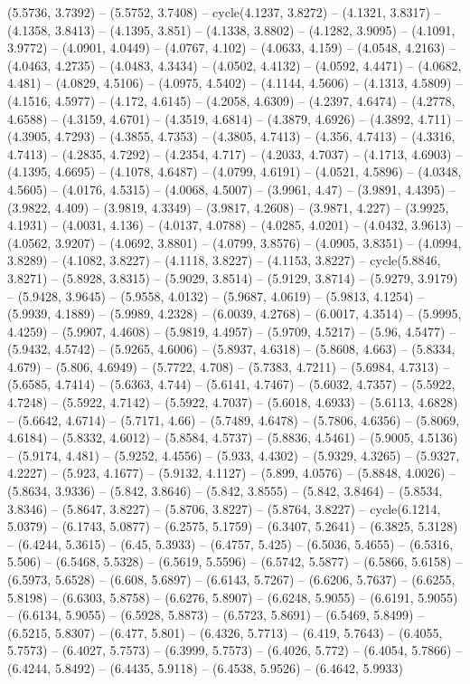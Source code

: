 (5.5736, 3.7392) -- (5.5752, 3.7408) -- cycle(4.1237, 3.8272) -- (4.1321, 3.8317) -- (4.1358, 3.8413) -- (4.1395, 3.851) -- (4.1338, 3.8802) -- (4.1282, 3.9095) -- (4.1091, 3.9772) -- (4.0901, 4.0449) -- (4.0767, 4.102) -- (4.0633, 4.159) -- (4.0548, 4.2163) -- (4.0463, 4.2735) -- (4.0483, 4.3434) -- (4.0502, 4.4132) -- (4.0592, 4.4471) -- (4.0682, 4.481) -- (4.0829, 4.5106) -- (4.0975, 4.5402) -- (4.1144, 4.5606) -- (4.1313, 4.5809) -- (4.1516, 4.5977) -- (4.172, 4.6145) -- (4.2058, 4.6309) -- (4.2397, 4.6474) -- (4.2778, 4.6588) -- (4.3159, 4.6701) -- (4.3519, 4.6814) -- (4.3879, 4.6926) -- (4.3892, 4.711) -- (4.3905, 4.7293) -- (4.3855, 4.7353) -- (4.3805, 4.7413) -- (4.356, 4.7413) -- (4.3316, 4.7413) -- (4.2835, 4.7292) -- (4.2354, 4.717) -- (4.2033, 4.7037) -- (4.1713, 4.6903) -- (4.1395, 4.6695) -- (4.1078, 4.6487) -- (4.0799, 4.6191) -- (4.0521, 4.5896) -- (4.0348, 4.5605) -- (4.0176, 4.5315) -- (4.0068, 4.5007) -- (3.9961, 4.47) -- (3.9891, 4.4395) -- (3.9822, 4.409) -- (3.9819, 4.3349) -- (3.9817, 4.2608) -- (3.9871, 4.227) -- (3.9925, 4.1931) -- (4.0031, 4.136) -- (4.0137, 4.0788) -- (4.0285, 4.0201) -- (4.0432, 3.9613) -- (4.0562, 3.9207) -- (4.0692, 3.8801) -- (4.0799, 3.8576) -- (4.0905, 3.8351) -- (4.0994, 3.8289) -- (4.1082, 3.8227) -- (4.1118, 3.8227) -- (4.1153, 3.8227) -- cycle(5.8846, 3.8271) -- (5.8928, 3.8315) -- (5.9029, 3.8514) -- (5.9129, 3.8714) -- (5.9279, 3.9179) -- (5.9428, 3.9645) -- (5.9558, 4.0132) -- (5.9687, 4.0619) -- (5.9813, 4.1254) -- (5.9939, 4.1889) -- (5.9989, 4.2328) -- (6.0039, 4.2768) -- (6.0017, 4.3514) -- (5.9995, 4.4259) -- (5.9907, 4.4608) -- (5.9819, 4.4957) -- (5.9709, 4.5217) -- (5.96, 4.5477) -- (5.9432, 4.5742) -- (5.9265, 4.6006) -- (5.8937, 4.6318) -- (5.8608, 4.663) -- (5.8334, 4.679) -- (5.806, 4.6949) -- (5.7722, 4.708) -- (5.7383, 4.7211) -- (5.6984, 4.7313) -- (5.6585, 4.7414) -- (5.6363, 4.744) -- (5.6141, 4.7467) -- (5.6032, 4.7357) -- (5.5922, 4.7248) -- (5.5922, 4.7142) -- (5.5922, 4.7037) -- (5.6018, 4.6933) -- (5.6113, 4.6828) -- (5.6642, 4.6714) -- (5.7171, 4.66) -- (5.7489, 4.6478) -- (5.7806, 4.6356) -- (5.8069, 4.6184) -- (5.8332, 4.6012) -- (5.8584, 4.5737) -- (5.8836, 4.5461) -- (5.9005, 4.5136) -- (5.9174, 4.481) -- (5.9252, 4.4556) -- (5.933, 4.4302) -- (5.9329, 4.3265) -- (5.9327, 4.2227) -- (5.923, 4.1677) -- (5.9132, 4.1127) -- (5.899, 4.0576) -- (5.8848, 4.0026) -- (5.8634, 3.9336) -- (5.842, 3.8646) -- (5.842, 3.8555) -- (5.842, 3.8464) -- (5.8534, 3.8346) -- (5.8647, 3.8227) -- (5.8706, 3.8227) -- (5.8764, 3.8227) -- cycle(6.1214, 5.0379) -- (6.1743, 5.0877) -- (6.2575, 5.1759) -- (6.3407, 5.2641) -- (6.3825, 5.3128) -- (6.4244, 5.3615) -- (6.45, 5.3933) -- (6.4757, 5.425) -- (6.5036, 5.4655) -- (6.5316, 5.506) -- (6.5468, 5.5328) -- (6.5619, 5.5596) -- (6.5742, 5.5877) -- (6.5866, 5.6158) -- (6.5973, 5.6528) -- (6.608, 5.6897) -- (6.6143, 5.7267) -- (6.6206, 5.7637) -- (6.6255, 5.8198) -- (6.6303, 5.8758) -- (6.6276, 5.8907) -- (6.6248, 5.9055) -- (6.6191, 5.9055) -- (6.6134, 5.9055) -- (6.5928, 5.8873) -- (6.5723, 5.8691) -- (6.5469, 5.8499) -- (6.5215, 5.8307) -- (6.477, 5.801) -- (6.4326, 5.7713) -- (6.419, 5.7643) -- (6.4055, 5.7573) -- (6.4027, 5.7573) -- (6.3999, 5.7573) -- (6.4026, 5.772) -- (6.4054, 5.7866) -- (6.4244, 5.8492) -- (6.4435, 5.9118) -- (6.4538, 5.9526) -- (6.4642, 5.9933) 